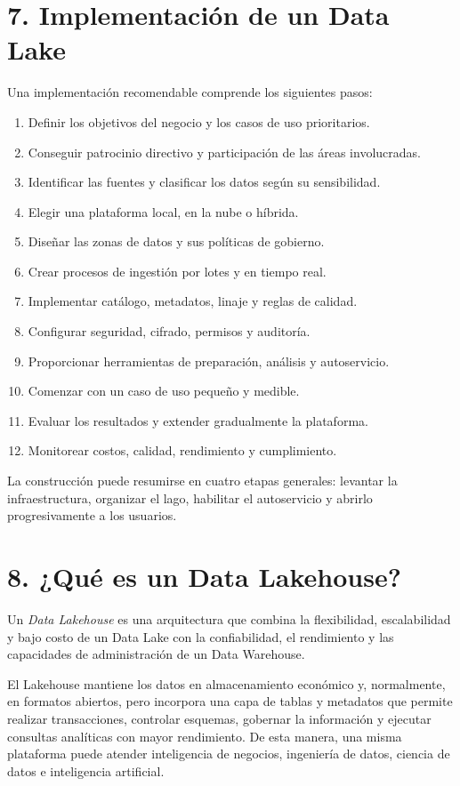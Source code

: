 \section*{7. Implementación de un Data Lake}

Una implementación recomendable comprende los siguientes pasos:

\begin{enumerate}
    \item Definir los objetivos del negocio y los casos de uso prioritarios.
    \item Conseguir patrocinio directivo y participación de las áreas involucradas.
    \item Identificar las fuentes y clasificar los datos según su sensibilidad.
    \item Elegir una plataforma local, en la nube o híbrida.
    \item Diseñar las zonas de datos y sus políticas de gobierno.
    \item Crear procesos de ingestión por lotes y en tiempo real.
    \item Implementar catálogo, metadatos, linaje y reglas de calidad.
    \item Configurar seguridad, cifrado, permisos y auditoría.
    \item Proporcionar herramientas de preparación, análisis y autoservicio.
    \item Comenzar con un caso de uso pequeño y medible.
    \item Evaluar los resultados y extender gradualmente la plataforma.
    \item Monitorear costos, calidad, rendimiento y cumplimiento.
\end{enumerate}

La construcción puede resumirse en cuatro etapas generales: levantar la
infraestructura, organizar el lago, habilitar el autoservicio y abrirlo
progresivamente a los usuarios.

\section*{8. ¿Qué es un Data Lakehouse?}

Un \textit{Data Lakehouse} es una arquitectura que combina la flexibilidad,
escalabilidad y bajo costo de un Data Lake con la confiabilidad, el rendimiento
y las capacidades de administración de un Data Warehouse.

El Lakehouse mantiene los datos en almacenamiento económico y, normalmente, en
formatos abiertos, pero incorpora una capa de tablas y metadatos que permite
realizar transacciones, controlar esquemas, gobernar la información y ejecutar
consultas analíticas con mayor rendimiento. De esta manera, una misma plataforma
puede atender inteligencia de negocios, ingeniería de datos, ciencia de datos e
inteligencia artificial.

